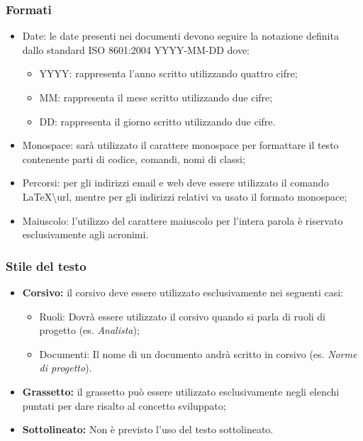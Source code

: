 \subsubsection{Formati}
\begin{itemize}
\item  Date: le date presenti nei documenti devono seguire la notazione definita dallo standard ISO 8601:2004 YYYY-MM-DD dove:
\begin{itemize}
	\item  YYYY: rappresenta l’anno scritto utilizzando quattro cifre;
	\item MM: rappresenta il mese scritto utilizzando due cifre;
	\item DD: rappresenta il giorno scritto utilizzando due cifre.
\end{itemize}
  \item  Monospace: sarà utilizzato il carattere monospace per formattare il testo contenente parti di codice, comandi, nomi di classi;
  \item  Percorsi: per gli indirizzi email e web  deve essere utilizzato il comando
  \LaTeX \textbackslash url, mentre per gli indirizzi relativi va usato il formato monospace;
  \item Maiuscolo: l'utilizzo del carattere maiuscolo per l'intera parola è riservato esclusivamente agli acronimi.
\end{itemize}
\subsubsection{Stile del testo}
\begin{itemize}
	\item \textbf{Corsivo:}
	il corsivo deve essere utilizzato esclusivamente nei seguenti casi:
	\begin{itemize}
		\item Ruoli: Dovrà essere utilizzato il corsivo quando si parla di ruoli di progetto (es. \textit{Analista});
		\item Documenti: Il nome di un documento andrà scritto in corsivo (es. \textit{Norme di progetto}).
	\end{itemize}
	\item  \textbf{Grassetto:} il grassetto può essere utilizzato esclusivamente negli elenchi puntati per dare risalto al concetto sviluppato;
	\item  \textbf{Sottolineato:} Non è previsto l'uso del testo sottolineato.
	\end{itemize}
